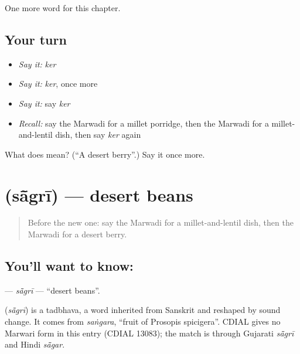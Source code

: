 \begin{grammarlens}[title={What you've built}]
One more word for this chapter.
\end{grammarlens}

\subsection*{Your turn}
\begin{itemize}
\raggedright
  \item \emph{Say it:} \emph{ker}
  \item \emph{Say it:} \emph{ker}, once more
  \item \emph{Say it:} say \emph{ker}
  \item \emph{Recall:} say the Marwadi for a millet porridge, then the Marwadi for a millet-and-lentil dish, then say \emph{ker} again
\end{itemize}

\begin{tcolorbox}[breakable,colback=teal!4,colframe=teal!35!black,title={Before you move on}]
What does  mean? (\textquotedblleft{}A desert berry\textquotedblright{}.) Say it once more.
\end{tcolorbox}
\section[\texorpdfstring{\mw{सांगरी} (sā̃grī)}{सांगरी (sā̃grī)}]{ (sā̃grī) — desert beans}

\label{lesson:MW-C131-sagri}



\begin{quote}
Before the new one: say the Marwadi for a millet-and-lentil dish, then the Marwadi for a desert berry.
\end{quote}

\subsection*{You'll want to know: }
\textbf{} — \emph{sā̃grī} — \textquotedblleft{}desert beans\textquotedblright{}.

\begin{cousinweb}
\textbf{} (\emph{sā̃grī}) is a tadbhava, a word inherited from Sanskrit and reshaped by sound change. It comes from \emph{saṅgara}, \textquotedblleft{}fruit of Prosopis spicigera\textquotedblright{}. CDIAL gives no Marwari form in this entry (CDIAL 13083); the match is through Gujarati \emph{sā̃grī} and Hindi \emph{sā̃gar}.
\end{cousinweb}

